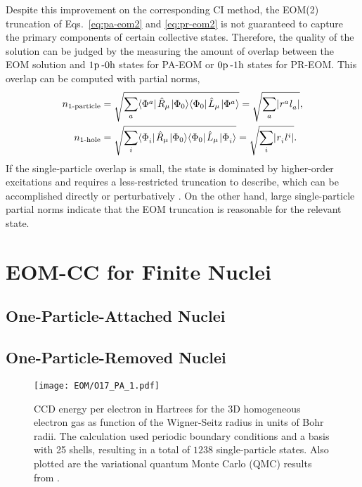 \documentclass[thesis.tex]{subfiles}
\begin{document}
Despite this improvement on the corresponding CI method, the EOM(2) truncation of Eqs.\ \eqref{eq:pa-eom2} and \eqref{eq:pr-eom2} is not guaranteed to capture the primary components of certain collective states.  Therefore, the quality of the solution can be judged by the measuring the amount of overlap between the EOM solution and $1\mathrm{p}\hspace{2pt}\text{-}0\mathrm{h}$ states for PA-EOM or $0\mathrm{p}\hspace{2pt}\text{-}1\mathrm{h}$ states for PR-EOM.  This overlap can be computed with partial norms,
\begin{align}
  \label{eq:partial_norms_p}
  n_{\text{1-particle}} &= \sqrt{\sum_{a} \langle \Phi^{a}_{} |\hspace{1pt}\hat{R}\hspace{-0.1pt}_{\mu}\hspace{1pt}\lvert \Phi_{0} \rangle\langle \Phi_{0} |\hspace{1pt}\hat{L}\hspace{-0.1pt}_{\mu}\hspace{1pt}\lvert \Phi^{a}_{} \rangle } = \sqrt{\sum_{a} \lvert {}^{}r^{a}_{}{}^{}l^{\hspace{0.1pt}}_{a} \rvert },\\
  \label{eq:partial_norms_h}
  n_{\text{1-hole}} &= \sqrt{\sum_{i} \langle \Phi^{}_{i} |\hspace{1pt}\hat{R}\hspace{-0.1pt}_{\mu}\hspace{1pt}\lvert \Phi_{0} \rangle\langle \Phi_{0} |\hspace{1pt}\hat{L}\hspace{-0.1pt}_{\mu}\hspace{1pt}\lvert \Phi^{}_{i} \rangle } = \sqrt{\sum_{i} \lvert {}^{}r^{}_{i}{}^{}l^{\hspace{0.1pt}i}_{} \rvert }.
\end{align}
If the single-particle overlap is small, the state is dominated by higher-order excitations and requires a less-restricted truncation to describe, which can be accomplished directly or perturbatively \cite{PARZUCHOWSKI2017044304,MORRIS2017}.  On the other hand, large single-particle partial norms indicate that the EOM truncation is reasonable for the relevant state.


\section{EOM-CC for Finite Nuclei} \label{section:eom_nuclei}

\subsection{One-Particle-Attached Nuclei} \label{section:eom_nuclei}

\subsection{One-Particle-Removed Nuclei} \label{section:eom_nuclei}

\begin{figure}[h]
  \texttt{[image: EOM/O17\_PA\_1.pdf]}
  \caption{CCD energy per electron in Hartrees for the 3D homogeneous electron gas as function of the Wigner-Seitz radius in units of Bohr radii. The calculation used periodic boundary conditions and a basis with 25 shells, resulting in a total of $1238$ single-particle states. Also plotted are the variational quantum Monte Carlo (QMC) results from \cite{LOPEZ2006}.}
  \label{fig:QDground}
\end{figure}
\end{document}
